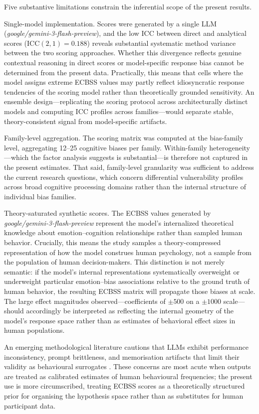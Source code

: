 \documentclass[12pt,a4paper]{article}
\newcommand{\ecbss}{\textsc{ECBSS}}
\begin{document}
Five substantive limitations constrain the inferential scope of the present results.

Single-model implementation. Scores were generated by a single LLM (\textit{google/gemini-3-flash-preview}), and the low ICC between direct and analytical scores (ICC$(2,1) = 0.188$) reveals substantial systematic method variance between the two scoring approaches. Whether this divergence reflects genuine contextual reasoning in direct scores or model-specific response bias cannot be determined from the present data. Practically, this means that cells where the model assigns extreme \ecbss{} values may partly reflect idiosyncratic response tendencies of the scoring model rather than theoretically grounded sensitivity. An ensemble design---replicating the scoring protocol across architecturally distinct models and computing ICC profiles across families---would separate stable, theory-consistent signal from model-specific artifacts.

Family-level aggregation. The scoring matrix was computed at the bias-family level, aggregating 12--25 cognitive biases per family. Within-family heterogeneity---which the factor analysis suggests is substantial---is therefore not captured in the present estimates. That said, family-level granularity was sufficient to address the current research questions, which concern differential vulnerability profiles across broad cognitive processing domains rather than the internal structure of individual bias families.

Theory-saturated synthetic scores. The \ecbss{} values generated by \textit{google/gemini-3-flash-preview} represent the model's internalized theoretical knowledge about emotion--cognition relationships rather than sampled human behavior. Crucially, this means the study samples a theory-compressed representation of how the model construes human psychology, not a sample from the population of human decision-makers. This distinction is not merely semantic: if the model's internal representations systematically overweight or underweight particular emotion--bias associations relative to the ground truth of human behavior, the resulting \ecbss{} matrix will propagate those biases at scale. The large effect magnitudes observed---coefficients of $\pm 500$ on a $\pm 1000$ scale---should accordingly be interpreted as reflecting the internal geometry of the model's response space rather than as estimates of behavioral effect sizes in human populations.

An emerging methodological literature cautions that LLMs exhibit performance inconsistency, prompt brittleness, and memorisation artifacts that limit their validity as behavioural surrogates \citep{gao2025llm, dillion2023ai}. These concerns are most acute when outputs are treated as calibrated estimates of human behavioural frequencies; the present use is more circumscribed, treating \ecbss{} scores as a theoretically structured prior for organising the hypothesis space rather than as substitutes for human participant data.
\end{document}
